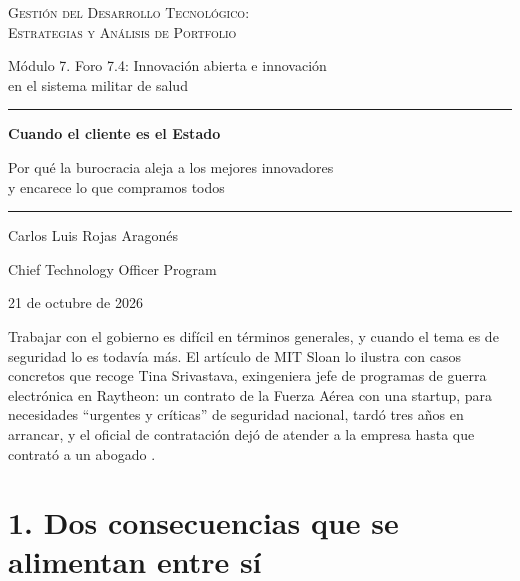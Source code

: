 \documentclass[11pt,letterpaper]{article}
\begin{document}
\begin{titlepage}
\centering
\vspace*{3.2cm}
{\large\scshape Gestión del Desarrollo Tecnológico:\\
Estrategias y Análisis de Portfolio\par}
\vspace{0.5cm}
{\normalsize Módulo 7. Foro 7.4: Innovación abierta e innovación\\
en el sistema militar de salud\par}
\vspace{2.6cm}
{\color{cEje}\rule{0.55\textwidth}{0.8pt}\par}
\vspace{0.7cm}
{\LARGE\bfseries Cuando el cliente es el Estado\par}
\vspace{0.5cm}
{\large Por qué la burocracia aleja a los mejores innovadores\\
y encarece lo que compramos todos\par}
\vspace{0.7cm}
{\color{cEje}\rule{0.55\textwidth}{0.8pt}\par}
\vfill
{\large Carlos Luis Rojas Aragonés\par}
\vspace{0.3cm}
{\normalsize Chief Technology Officer Program\par}
\vspace{0.3cm}
{\normalsize 21 de octubre de 2026\par}
\vspace*{1.5cm}
\end{titlepage}

Trabajar con el gobierno es difícil en términos generales, y cuando el tema
es de seguridad lo es todavía más. El artículo de MIT Sloan lo ilustra con
casos concretos que recoge Tina Srivastava, exingeniera jefe de programas de
guerra electrónica en Raytheon: un contrato de la Fuerza Aérea con una
startup, para necesidades \enquote{urgentes y críticas} de seguridad
nacional, tardó tres años en arrancar, y el oficial de contratación dejó de
atender a la empresa hasta que contrató a un abogado
\parencite{somers2019}.

\section*{1. Dos consecuencias que se alimentan entre sí}
\end{document}
